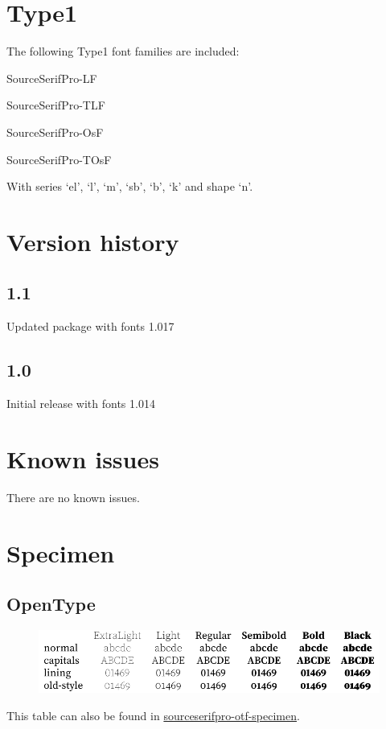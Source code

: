 \documentclass[10pt,a4paper,english]{article}
\newcommand*\file[1]{\href{run:#1.pdf}{#1}}
\begin{document}
\begin{multicols}{2}
\section{Type1}
The following Type1 font families are included:
\begin{itemize*}
	\item SourceSerifPro-LF
	\item SourceSerifPro-TLF
	\item SourceSerifPro-OsF
	\item SourceSerifPro-TOsF
\end{itemize*}
With series ‘el’, ‘l’, ‘m’, ‘sb’, ‘b’, ‘k’ and shape ‘n’.

\section{Version history}
\subsection*{1.1}
\begin{itemize*}
	\item Updated package with fonts 1.017
\end{itemize*}

\subsection*{1.0}
\begin{itemize*}
	\item Initial release with fonts 1.014
\end{itemize*}

\section{Known issues}
\begin{itemize*}
	\item There are no known issues.
\end{itemize*}
\vspace{0pt plus 1filll}\mbox{}
\newpage
\end{multicols}

\section{Specimen}
\label{sec:specimen}
\subsection{OpenType}
\begin{figure}[ht]
	\centering
	\includegraphics{sourceserifpro-otf-specimen}
\end{figure}
This table can also be found in \file{sourceserifpro-otf-specimen}.
\end{document}
